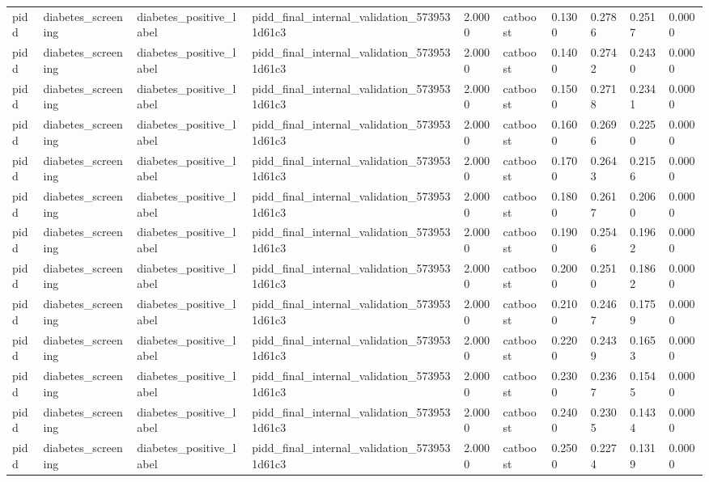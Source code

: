\begin{tabular}{llllllllll}
pidd & diabetes\_screening & diabetes\_positive\_label & pidd\_final\_internal\_validation\_5739531d61c3 & 2.0000 & catboost & 0.1300 & 0.2786 & 0.2517 & 0.0000 \\
pidd & diabetes\_screening & diabetes\_positive\_label & pidd\_final\_internal\_validation\_5739531d61c3 & 2.0000 & catboost & 0.1400 & 0.2742 & 0.2430 & 0.0000 \\
pidd & diabetes\_screening & diabetes\_positive\_label & pidd\_final\_internal\_validation\_5739531d61c3 & 2.0000 & catboost & 0.1500 & 0.2718 & 0.2341 & 0.0000 \\
pidd & diabetes\_screening & diabetes\_positive\_label & pidd\_final\_internal\_validation\_5739531d61c3 & 2.0000 & catboost & 0.1600 & 0.2696 & 0.2250 & 0.0000 \\
pidd & diabetes\_screening & diabetes\_positive\_label & pidd\_final\_internal\_validation\_5739531d61c3 & 2.0000 & catboost & 0.1700 & 0.2643 & 0.2156 & 0.0000 \\
pidd & diabetes\_screening & diabetes\_positive\_label & pidd\_final\_internal\_validation\_5739531d61c3 & 2.0000 & catboost & 0.1800 & 0.2617 & 0.2060 & 0.0000 \\
pidd & diabetes\_screening & diabetes\_positive\_label & pidd\_final\_internal\_validation\_5739531d61c3 & 2.0000 & catboost & 0.1900 & 0.2546 & 0.1962 & 0.0000 \\
pidd & diabetes\_screening & diabetes\_positive\_label & pidd\_final\_internal\_validation\_5739531d61c3 & 2.0000 & catboost & 0.2000 & 0.2510 & 0.1862 & 0.0000 \\
pidd & diabetes\_screening & diabetes\_positive\_label & pidd\_final\_internal\_validation\_5739531d61c3 & 2.0000 & catboost & 0.2100 & 0.2467 & 0.1759 & 0.0000 \\
pidd & diabetes\_screening & diabetes\_positive\_label & pidd\_final\_internal\_validation\_5739531d61c3 & 2.0000 & catboost & 0.2200 & 0.2439 & 0.1653 & 0.0000 \\
pidd & diabetes\_screening & diabetes\_positive\_label & pidd\_final\_internal\_validation\_5739531d61c3 & 2.0000 & catboost & 0.2300 & 0.2367 & 0.1545 & 0.0000 \\
pidd & diabetes\_screening & diabetes\_positive\_label & pidd\_final\_internal\_validation\_5739531d61c3 & 2.0000 & catboost & 0.2400 & 0.2305 & 0.1434 & 0.0000 \\
pidd & diabetes\_screening & diabetes\_positive\_label & pidd\_final\_internal\_validation\_5739531d61c3 & 2.0000 & catboost & 0.2500 & 0.2274 & 0.1319 & 0.0000 \\

\end{tabular}
